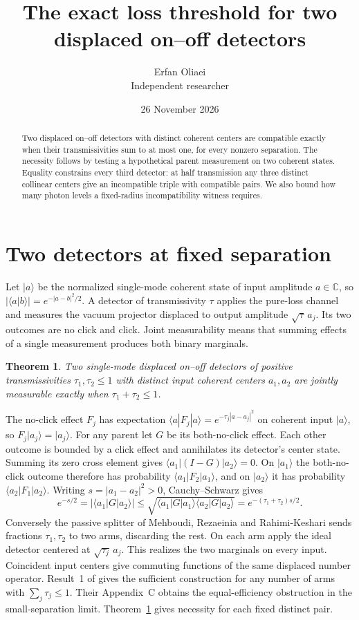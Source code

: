 \documentclass[10pt,a4paper]{article}
\author{Erfan Oliaei\\[2pt]\small Independent researcher}
\date{26 November 2026}
\title{The exact loss threshold for two displaced on--off detectors}
\newtheorem{theorem}{Theorem}
\newcommand{\C}{\mathbb C}
\newcommand{\ket}[1]{\lvert #1\rangle}
\begin{document}
\maketitle
\begin{abstract}
Two displaced on--off detectors with distinct coherent centers are compatible exactly when their transmissivities sum to at most one, for every nonzero separation. The necessity follows by testing a hypothetical parent measurement on two coherent states. Equality constrains every third detector: at half transmission any three distinct collinear centers give an incompatible triple with compatible pairs. We also bound how many photon levels a fixed-radius incompatibility witness requires.
\end{abstract}
\section{Two detectors at fixed separation}
Let \(\ket a\) be the normalized single-mode coherent state of input amplitude \(a\in\C\), so \(|\langle a|b\rangle|=e^{-|a-b|^2/2}\). A detector of transmissivity \(\tau\) applies the pure-loss channel and measures the vacuum projector displaced to output amplitude \(\sqrt\tau\,a_j\). Its two outcomes are no click and click. Joint measurability means that summing effects of a single measurement produces both binary marginals.
\begin{theorem}\label{pair}
Two single-mode displaced on--off detectors of positive transmissivities
\(\tau_1,\tau_2\le1\) with distinct input coherent centers \(a_1,a_2\)
are jointly measurable exactly when \(\tau_1+\tau_2\le1\).
\end{theorem}
The no-click effect \(F_j\) has expectation
\(\langle a|F_j|a\rangle=e^{-\tau_j|a-a_j|^2}\) on coherent input \(\ket a\),
so \(F_j\ket{a_j}=\ket{a_j}\). For any parent let \(G\) be its both-no-click
effect. Each other outcome is bounded by a click effect and annihilates its detector's center state. Summing its zero cross element gives \(\langle a_1|(I-G)|a_2\rangle=0\).
On \(\ket{a_1}\) the both-no-click outcome therefore has probability \(\langle a_1|F_2|a_1\rangle\), and on \(\ket{a_2}\) it has probability \(\langle a_2|F_1|a_2\rangle\). Writing \(s=|a_1-a_2|^2>0\), Cauchy--Schwarz gives
\[
 e^{-s/2}=|\langle a_1|G|a_2\rangle|
 \le\sqrt{\langle a_1|G|a_1\rangle\langle a_2|G|a_2\rangle}
 = e^{-(\tau_1+\tau_2)s/2}.
\]
Conversely the passive splitter of Mehboudi, Rezaeinia and Rahimi-Keshari \cite[Result~1]{loss} sends fractions \(\tau_1,\tau_2\) to
two arms, discarding the rest. On each arm apply the ideal detector centered
at \(\sqrt{\tau_j}\,a_j\). This realizes the two marginals on every input.
Coincident input centers give commuting functions of the same displaced
number operator. Result~1 of \cite{loss} gives the sufficient construction for any number of arms with \(\sum_j\tau_j\le1\). Their Appendix~C obtains the equal-efficiency obstruction in the small-separation limit. Theorem~\ref{pair} gives necessity for each fixed distinct pair.
\end{document}
